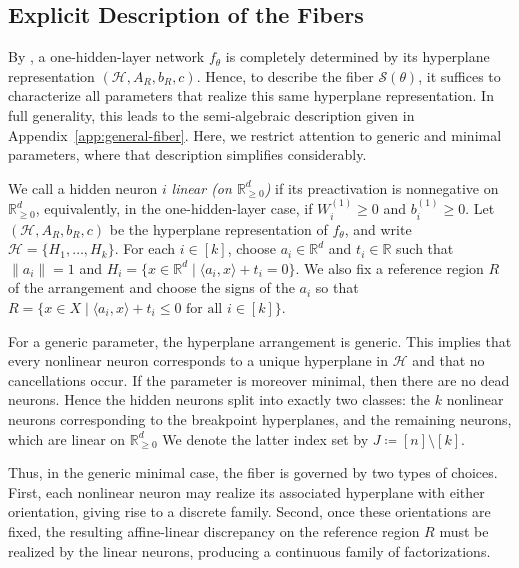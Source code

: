 \documentclass{article}
\theoremstyle{definition}
\newcommand{\R}{\mathbb{R}}
\newcommand{\weights}[1]{W^{(#1)}}
\newcommand{\bias}[1]{b^{(#1)}}
\newcommand{\fiber}[1]{\mathcal{S}({#1})}
\newcommand{\inner}[1]{\langle #1 \rangle}
\newcommand{\orthant}[1]{\R_{\geq 0}^{#1}}
\begin{document}
\subsection{Explicit Description of the Fibers} 
\label{sec:explicit_description_layerwise_generic}

By , a one-hidden-layer network $f_\theta$ is completely determined by its hyperplane representation $(\mathcal{H},A_R,b_R,c)$. Hence, to describe the fiber $\fiber{\theta}$, it suffices to characterize all parameters that realize this same hyperplane representation. In full generality, this leads to the semi-algebraic description given in Appendix~\ref{app:general-fiber}. Here, we restrict attention to generic and minimal parameters, where that description simplifies considerably.

We call a hidden neuron $i$ \emph{linear (on $\orthant{d}$)} if its preactivation is nonnegative on $\orthant{d}$, equivalently, in the one-hidden-layer case, if $\weights{1}_i \ge 0$ and $\bias{1}_i \ge 0$.
Let $(\mathcal{H},A_R,b_R,c)$ be the hyperplane representation of $f_\theta$, and write
$\mathcal{H}=\{H_1,\dots,H_k\}$. 
For each $i\in[k]$, choose $a_i\in\R^d$ and $t_i\in\R$ such that $\|a_i\|=1$ and
$H_i=\{x\in\R^d \mid \inner{a_i,x}+t_i=0\}$. 
We also fix a reference region $R$ of the arrangement and choose the signs of the %
$a_i$ so that
$R=\{x\in X \mid \inner{a_i,x}+t_i\le 0 \text{ for all } i\in[k]\}$. 

For a generic parameter, the hyperplane arrangement is generic. This implies that every nonlinear neuron corresponds to a unique hyperplane in $\mathcal H$ and that no cancellations occur. If the parameter is moreover minimal, then there are no dead neurons. Hence the hidden neurons split into exactly two classes: the $k$ nonlinear neurons corresponding to the breakpoint hyperplanes, and the remaining neurons, which are linear on $\orthant{d}$ We denote the latter index set by
$
J\coloneqq [n]\setminus [k]
$. 

Thus, in the generic minimal case, the fiber is governed by two types of choices. First, each nonlinear neuron may realize its associated hyperplane with either orientation, giving rise to a discrete family. Second, once these orientations are fixed, the resulting affine-linear discrepancy on the reference region $R$ must be realized by the linear neurons, producing a continuous family of factorizations.
\end{document}
